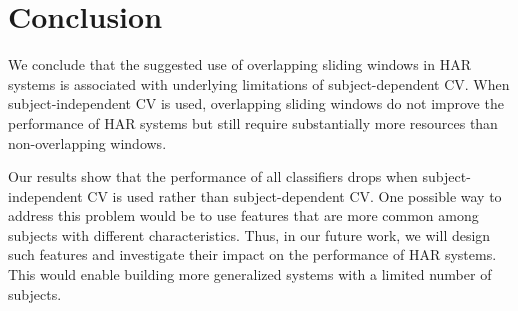 \section{Conclusion} \label{sec:conclusion}
We conclude that the suggested use of overlapping sliding windows in HAR systems is associated with underlying limitations of subject-dependent CV. When subject-independent CV is used, overlapping sliding windows do not improve the performance of HAR systems but still require substantially more resources than non-overlapping windows.


Our results show that the performance of all classifiers drops when subject-independent CV is used rather than subject-dependent CV. One possible way to address this problem would be to use features that are more common among subjects with different characteristics. Thus,   
in our future work, we will design such features and investigate their impact on the performance of HAR systems. This would enable building more generalized systems with a limited number of subjects. 